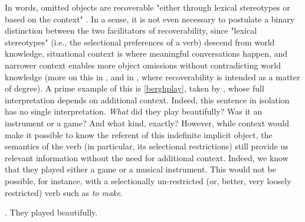 In  words, omitted objects are recoverable "either through lexical stereotypes or based on the context" \parencite[7]{Kardos2010}. In a sense, it is not even necessary to postulate a binary distinction between the two facilitators of recoverability, since "lexical stereotypes" (i.e., the selectional preferences of a verb) descend from world knowledge, situational context is where meaningful conversations happen, and narrower context enables more object omissions without contradicting world knowledge (more on this in , and in \textcite{Glass2013, Glass2020, glass2022english}, where recoverability is intended as a matter of degree). A prime example of this is \ref{berghplay}, taken by \textcite[24]{BerghOhlander2016}, whose full interpretation depends on additional context. Indeed, this sentence in isolation has no single interpretation. \textit{What} did they play beautifully? Was it an instrument or a game? And what kind, exactly? However, while context would make it possible to know the referent of this indefinite implicit object, the semantics of the verb (in particular, its selectional restrictions) still provide us relevant information without the need for additional context. Indeed, we know that they played either a game or a musical instrument. This would not be possible, for instance, with a selectionally un-restricted (or, better, very loosely restricted) verb such as \textit{to make}.

\ex. \label{berghplay} They played beautifully.

